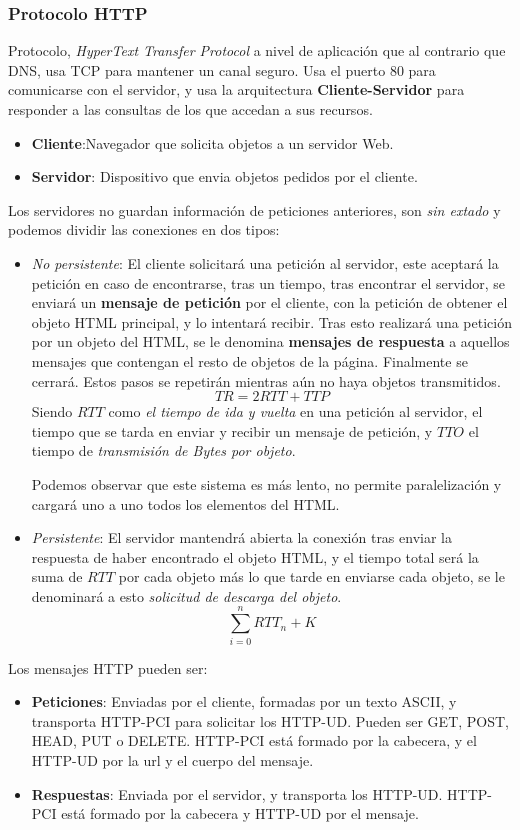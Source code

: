 \subsubsection{Protocolo HTTP}
\noindent Protocolo, \textit{HyperText Transfer Protocol} a nivel de aplicación que al contrario que DNS, usa TCP para mantener un canal seguro. Usa el puerto 80 para comunicarse con el servidor, y usa la arquitectura \textbf{Cliente-Servidor} para responder a las consultas de los que accedan a sus recursos.
\begin{itemize}
        \item \textbf{Cliente}:Navegador que solicita objetos a un servidor Web.
        \item \textbf{Servidor}: Dispositivo que envia objetos pedidos por el cliente.
\end{itemize}
\noindent Los servidores no guardan información de peticiones anteriores, son \textit{sin extado} y podemos dividir las conexiones en dos tipos:
\begin{itemize}
        \item \textit{No persistente}: El cliente solicitará una petición al servidor, este aceptará la petición en caso de encontrarse, tras un tiempo, tras encontrar el servidor, se enviará un \textbf{mensaje de petición} por el cliente, con la petición de obtener el objeto HTML principal, y lo intentará recibir. Tras esto realizará una petición por un objeto del HTML, se le denomina \textbf{mensajes de respuesta} a aquellos mensajes que contengan el resto de objetos de la página. Finalmente se cerrará. Estos pasos se repetirán mientras aún no haya objetos transmitidos.
              \[
                      \boxed{TR = 2 RTT + TTP}
              \]
              \noindent Siendo \(RTT\) como \textit{el tiempo de ida y vuelta} en una petición al servidor, el tiempo que se tarda en enviar y recibir un mensaje de petición, y \(TTO\) el tiempo de \textit{transmisión de Bytes por objeto}.
              \par \noindent Podemos observar que este sistema es más lento, no permite paralelización y cargará uno a uno todos los elementos del HTML.
        \item \textit{Persistente}: El servidor mantendrá abierta la conexión tras enviar la respuesta de haber encontrado el objeto HTML, y el tiempo total será la suma de \(RTT\) por cada objeto más lo que tarde en enviarse cada objeto, se le denominará a esto \textit{solicitud de descarga del objeto}.
              \[
                      \boxed{\sum^n_{i=0}RTT_n + K}
              \]
\end{itemize}
\noindent Los mensajes HTTP pueden ser:
\begin{itemize}
        \item \textbf{Peticiones}: Enviadas por el cliente, formadas por un texto ASCII, y transporta HTTP-PCI para solicitar los HTTP-UD. Pueden ser GET, POST, HEAD, PUT o DELETE. HTTP-PCI está formado por la cabecera, y el HTTP-UD por la url y el cuerpo del mensaje.
        \item \textbf{Respuestas}: Enviada por el servidor, y transporta los HTTP-UD. HTTP-PCI está formado por la cabecera y HTTP-UD por el mensaje.
\end{itemize}

